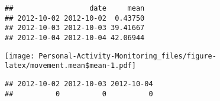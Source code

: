 \documentclass[]{article}
\newenvironment{Shaded}{\begin{snugshade}}{\end{snugshade}}
\newcommand{\KeywordTok}[1]{\textcolor[rgb]{0.13,0.29,0.53}{\textbf{#1}}}
\newcommand{\DataTypeTok}[1]{\textcolor[rgb]{0.13,0.29,0.53}{#1}}
\newcommand{\DecValTok}[1]{\textcolor[rgb]{0.00,0.00,0.81}{#1}}
\newcommand{\StringTok}[1]{\textcolor[rgb]{0.31,0.60,0.02}{#1}}
\newcommand{\OperatorTok}[1]{\textcolor[rgb]{0.81,0.36,0.00}{\textbf{#1}}}
\newcommand{\NormalTok}[1]{#1}
\begin{document}
\begin{verbatim}
##                  date     mean
## 2012-10-02 2012-10-02  0.43750
## 2012-10-03 2012-10-03 39.41667
## 2012-10-04 2012-10-04 42.06944
\end{verbatim}

\begin{Shaded}
\end{Shaded}

\texttt{[image: Personal-Activity-Monitoring\_files/figure-latex/movement.mean\$mean-1.pdf]}

\begin{Shaded}
\end{Shaded}

\begin{verbatim}
## 2012-10-02 2012-10-03 2012-10-04 
##          0          0          0
\end{verbatim}
\end{document}
